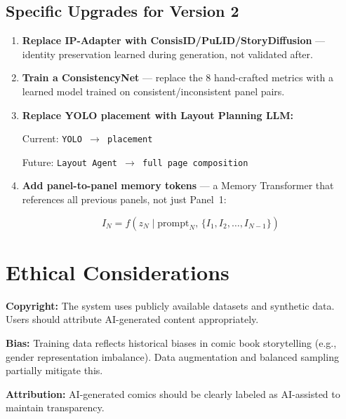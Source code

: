 \documentclass[11pt,a4paper,twocolumn]{article}
\begin{document}
\subsection{Specific Upgrades for Version 2}

\begin{enumerate}[leftmargin=*, nosep]
    \item \textbf{Replace IP-Adapter with ConsisID/PuLID/StoryDiffusion} --- identity preservation learned during generation, not validated after.

    \item \textbf{Train a ConsistencyNet} --- replace the 8 hand-crafted metrics with a learned model trained on consistent/inconsistent panel pairs.

    \item \textbf{Replace YOLO placement with Layout Planning LLM:}

    \begin{center}
    \footnotesize
    Current: \texttt{YOLO $\to$ placement}

    Future: \texttt{Layout Agent $\to$ full page composition}
    \end{center}

    \item \textbf{Add panel-to-panel memory tokens} --- a Memory Transformer that references all previous panels, not just Panel~1:

    \begin{equation}
    I_N = f(z_N \mid \text{prompt}_N,\, \{I_1, I_2, \ldots, I_{N-1}\})
    \end{equation}
\end{enumerate}

\section{Ethical Considerations}
\label{sec:ethics}

\textbf{Copyright:} The system uses publicly available datasets and synthetic data. Users should attribute AI-generated content appropriately.

\textbf{Bias:} Training data reflects historical biases in comic book storytelling (e.g., gender representation imbalance). Data augmentation and balanced sampling partially mitigate this.

\textbf{Attribution:} AI-generated comics should be clearly labeled as AI-assisted to maintain transparency.
\end{document}
